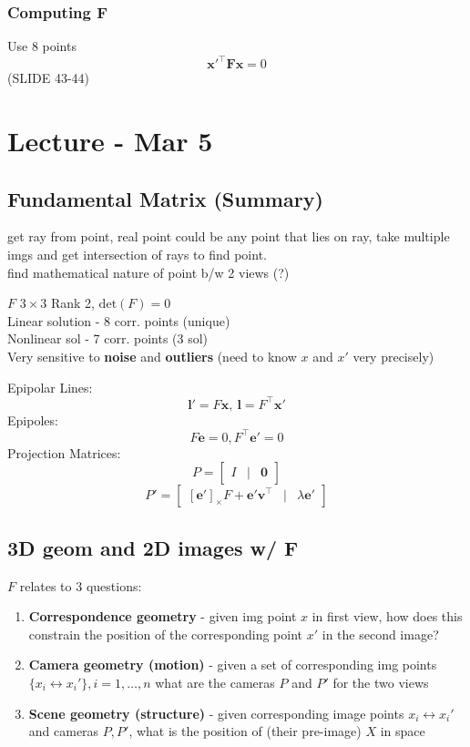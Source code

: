 \documentclass{article}
\begin{document}
\subsubsection{Computing F}
Use 8 points
\[
    \mathbf{x'^\top Fx} =0 
\]
(SLIDE 43-44)



\section{Lecture - Mar 5}
\subsection{Fundamental Matrix (Summary)}
get ray from point, real point could be any point that lies on ray, take 
multiple imgs and get intersection of rays to find point.
\\
find mathematical nature of point b/w 2 views (?)

\begin{definition}
    {$F$}{}
    $3 \times 3$ Rank 2, $\mathrm{det}(F)=0$\\
    Linear solution - 8 corr. points (unique)
    \\
    Nonlinear sol - 7 corr. points (3 sol)
    \\
    Very sensitive to \textbf{noise} and \textbf{outliers} (need to know $x$ and $x'$ very precisely)
\end{definition}
\noindent
Epipolar Lines:
\[
    \mathbf l' = F\mathbf x, \ \mathbf l = F^\top \mathbf x'
\]
Epipoles:
\[
    F\mathbf e = 0, F^\top \mathbf e' = 0
\]
Projection Matrices:
\[
    P = \begin{bmatrix}
        I & | & \mathbf 0
    \end{bmatrix}
\]
\[
    P' = \begin{bmatrix}
        [\mathbf e']_\times F + \mathbf{e'v^\top} & | & \lambda \mathbf e'
    \end{bmatrix}
\]



\subsection{3D geom and 2D images w/ F}
$F$ relates to 3 questions:
\begin{enumerate}
    \item \textbf{Correspondence geometry} - given img point $x$ in first view, how does 
    this constrain the position of the corresponding point $x'$ in the second image?
    \item \textbf{Camera geometry (motion)} - given a set of corresponding img points $\{ x_i \leftrightarrow x_i' \}, i=1,\ldots,n$
    what are the cameras $P$ and $P'$ for the two views
    \item \textbf{Scene geometry (structure)} - given corresponding image points $x_i \leftrightarrow x_i'$ and 
    cameras $P, P'$, what is the position of (their pre-image) $X$ in space
\end{enumerate}
\end{document}

